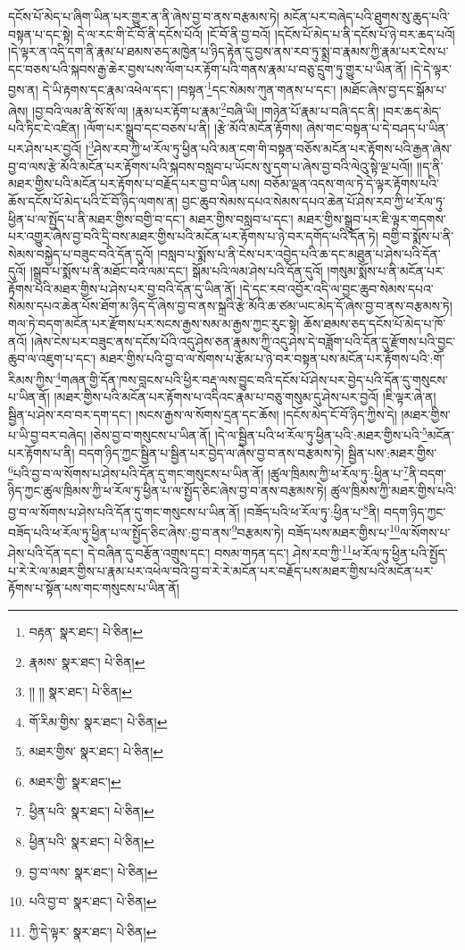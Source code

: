 དངོས་པོ་མེད་པ་ཞིག་ཡིན་པར་གྱུར་ན་ནི་ཞེས་བྱ་བ་ནས་བརྩམས་ཏེ། མངོན་པར་བཞེད་པའི་ཐུགས་སུ་ཆུད་པའི་བསྟན་པ་དང་སྟེ། དེ་ལ་རང་གི་ངོ་བོ་ནི་དངོས་པོའོ། །ངོ་བོ་ནི་བྱ་བའོ། །དངོས་པོ་མེད་པ་ནི་དངོས་པོ་ཉེ་བར་ཆད་པའོ། །དེ་ལྟར་ན་འདི་དག་ནི་རྣམ་པ་ཐམས་ཅད་མཁྱེན་པ་ཉིད་རྟེན་དུ་བྱས་ནས་རབ་ཏུ་སྨྲ་བ་རྣམས་ཀྱི་རྣམ་པར་ངེས་པ་དང་བཅས་པའི་སྐབས་རྒྱ་ཆེར་བྱས་པས་ལོག་པར་རྟོག་པའི་གནས་རྣམ་པ་བཅུ་དྲུག་ཏུ་གྱུར་པ་ཡིན་ནོ། །དེ་དེ་ལྟར་བྱས་ན། དེ་ཡི་རྟགས་དང་རྣམ་འཕེལ་དང་། །བསྟན་\footnote{བརྟན་  སྣར་ཐང་།  པེ་ཅིན། }དང་སེམས་ཀུན་གནས་པ་དང་། །མཐོང་ཞེས་བྱ་དང་སྒོམ་པ་ཞེས། །བྱ་བའི་ལམ་ནི་སོ་སོ་ལ། །རྣམ་པར་རྟོག་པ་རྣམ་\footnote{རྣམས་  སྣར་ཐང་།  པེ་ཅིན། }བཞི་ཡི། །གཉེན་པོ་རྣམ་པ་བཞི་དང་ནི། །བར་ཆད་མེད་པའི་ཏིང་ངེ་འཛིན། །ལོག་པར་སྒྲུབ་དང་བཅས་པ་ནི། །རྩེ་མོའི་མངོན་རྟོགས། ཞེས་གང་བསྟན་པ་དེ་བཤད་པ་ཡིན་པར་ཤེས་པར་བྱའོ། །\footnote{།། །།  སྣར་ཐང་།  པེ་ཅིན། }ཤེས་རབ་ཀྱི་ཕ་རོལ་ཏུ་ཕྱིན་པའི་མན་ངག་གི་བསྟན་བཅོས་མངོན་པར་རྟོགས་པའི་རྒྱན་ཞེས་བྱ་བ་ལས་རྩེ་མོའི་མངོན་པར་རྟོགས་པའི་སྐབས་བསླབ་པ་ཡོངས་སུ་དག་པ་ཞེས་བྱ་བའི་ལེའུ་སྟེ་ལྔ་པའོ།། །།ད་ནི་མཐར་གྱིས་པའི་མངོན་པར་རྟོགས་པ་བརྗོད་པར་བྱ་བ་ཡིན་པས། བཅོམ་ལྡན་འདས་གལ་ཏེ་དེ་ལྟར་རྟོགས་པའི་ཆོས་དངོས་པོ་མེད་པའི་ངོ་བོ་ཉིད་ལགས་ན། བྱང་ཆུབ་སེམས་དཔའ་སེམས་དཔའ་ཆེན་པོ་ཤེས་རབ་ཀྱི་ཕ་རོལ་ཏུ་ཕྱིན་པ་ལ་སྤྱོད་པ་ནི་མཐར་གྱིས་བགྱི་བ་དང་། མཐར་གྱིས་བསླབ་པ་དང་། མཐར་གྱིས་སྒྲུབ་པར་ཇི་ལྟར་གདགས་པར་འགྱུར་ཞེས་བྱ་བའི་དྲི་བས་མཐར་གྱིས་པའི་མངོན་པར་རྟོགས་པ་ཉེ་བར་དགོད་པའི་དོན་ཏེ། བགྱི་བ་སྨོས་པ་ནི་སེམས་བསྐྱེད་པ་བཟུང་བའི་དོན་དུའོ། །བསླབ་པ་སྨོས་པ་ནི་ངེས་པར་འབྱེད་པའི་ཆ་དང་མཐུན་པ་ཤེས་པའི་དོན་དུའོ། །སྒྲུབ་པ་སྨོས་པ་ནི་མཐོང་བའི་ལམ་དང་། སྒོམ་པའི་ལམ་ཤེས་པའི་དོན་དུའོ། །གསུམ་སྨོས་པ་ནི་མངོན་པར་རྟོགས་པའི་མཐར་གྱིས་པ་ཤེས་པར་བྱ་བའི་དོན་དུ་ཡིན་ནོ། །དེ་དང་རབ་འབྱོར་འདི་ལ་བྱང་ཆུབ་སེམས་དཔའ་སེམས་དཔའ་ཆེན་པོས་ཐོག་མ་ཉིད་དོ་ཞེས་བྱ་བ་ནས་སྐྲའི་རྩེ་མོའི་ཆ་ཙམ་ཡང་མེད་དོ་ཞེས་བྱ་བ་ནས་བརྩམས་ཏེ། གལ་ཏེ་བདག་མངོན་པར་རྫོགས་པར་སངས་རྒྱས་སམ་མ་རྒྱས་ཀྱང་རུང་སྟེ། ཆོས་ཐམས་ཅད་དངོས་པོ་མེད་པ་ཁོ་ནའོ། །ཞེས་ངེས་པར་བཟུང་ནས་དངོས་པོའི་འདུ་ཤེས་ཅན་རྣམས་ཀྱི་འདུ་ཤེས་དེ་བཟློག་པའི་དོན་དུ་རྫོགས་པའི་བྱང་ཆུབ་ལ་འཇུག་པ་དང་། མཐར་གྱིས་པའི་བྱ་བ་ལ་སོགས་པ་རྩོམ་པ་ཉེ་བར་བསྟན་པས་མངོན་པར་རྟོགས་པའི་:གོ་རིམས་ཀྱིས་\footnote{གོ་རིམ་གྱིས་  སྣར་ཐང་།  པེ་ཅིན། }གཞན་གྱི་དོན་ཁས་བླངས་པའི་ཕྱིར་བརྡ་ལས་བྱུང་བའི་དངོས་པོ་ཤེས་པར་བྱེད་པའི་དོན་དུ་གསུངས་པ་ཡིན་ནོ། །མཐར་གྱིས་པའི་མངོན་པར་རྟོགས་པ་འདིའང་རྣམ་པ་བཅུ་གསུམ་དུ་ཤེས་པར་བྱའོ། །ཇི་ལྟར་ཞེ་ན། སྦྱིན་པ་ཤེས་རབ་བར་དག་དང་། །སངས་རྒྱས་ལ་སོགས་དྲན་དང་ཆོས། །དངོས་མེད་ངོ་བོ་ཉིད་ཀྱིས་དེ། །མཐར་གྱིས་པ་ཡི་བྱ་བར་བཞེད། །ཅེས་བྱ་བ་གསུངས་པ་ཡིན་ནོ། །དེ་ལ་སྦྱིན་པའི་ཕ་རོལ་ཏུ་ཕྱིན་པའི་:མཐར་གྱིས་པའི་\footnote{མཐར་གྱིས་  སྣར་ཐང་།  པེ་ཅིན། }མངོན་པར་རྟོགས་པ་ནི། བདག་ཉིད་ཀྱང་སྦྱིན་པ་སྦྱིན་པར་བྱེད་ལ་ཞེས་བྱ་བ་ནས་བརྩམས་ཏེ། སྦྱིན་པས་:མཐར་གྱིས་\footnote{མཐར་གྱི་  སྣར་ཐང་། }པའི་བྱ་བ་ལ་སོགས་པ་ཤེས་པའི་དོན་དུ་གང་གསུངས་པ་ཡིན་ནོ། །ཚུལ་ཁྲིམས་ཀྱི་ཕ་རོལ་ཏུ་:ཕྱིན་པ་\footnote{ཕྱིན་པའི་  སྣར་ཐང་།  པེ་ཅིན། }ནི་བདག་ཉིད་ཀྱང་ཚུལ་ཁྲིམས་ཀྱི་ཕ་རོལ་ཏུ་ཕྱིན་པ་ལ་སྤྱོད་ཅིང་ཞེས་བྱ་བ་ནས་བརྩམས་ཏེ། ཚུལ་ཁྲིམས་ཀྱི་མཐར་གྱིས་པའི་བྱ་བ་ལ་སོགས་པ་ཤེས་པའི་དོན་དུ་གང་གསུངས་པ་ཡིན་ནོ། །བཟོད་པའི་ཕ་རོལ་ཏུ་:ཕྱིན་པ་\footnote{ཕྱིན་པའི་  སྣར་ཐང་།  པེ་ཅིན། }ནི། བདག་ཉིད་ཀྱང་བཟོད་པའི་ཕ་རོལ་ཏུ་ཕྱིན་པ་ལ་སྤྱོད་ཅིང་ཞེས་:བྱ་བ་ནས་\footnote{བྱ་བ་ལས་  སྣར་ཐང་།  པེ་ཅིན། }བརྩམས་ཏེ། བཟོད་པས་མཐར་གྱིས་པ་\footnote{པའི་བྱ་བ་  སྣར་ཐང་།  པེ་ཅིན། }ལ་སོགས་པ་ཤེས་པའི་དོན་དང་། དེ་བཞིན་དུ་བརྩོན་འགྲུས་དང་། བསམ་གཏན་དང་། ཤེས་རབ་ཀྱི་\footnote{ཀྱི་དེ་ལྟར་  སྣར་ཐང་།  པེ་ཅིན། }ཕ་རོལ་ཏུ་ཕྱིན་པའི་སྤྱོད་པ་རེ་རེ་ལ་མཐར་གྱིས་པ་རྣམ་པར་འཕེལ་བའི་བྱ་བ་རེ་རེ་མངོན་པར་བརྗོད་པས་མཐར་གྱིས་པའི་མངོན་པར་རྟོགས་པ་སྟོན་པས་གང་གསུངས་པ་ཡིན་ནོ། 